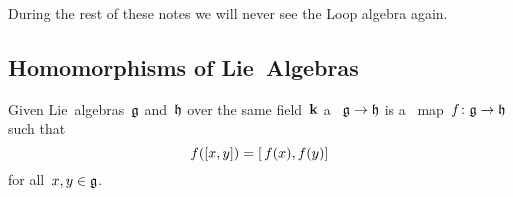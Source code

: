 \begin{remark}
  During the rest of these notes we will never see the Loop algebra again.
\end{remark}





\subsection{Homomorphisms of Lie~Algebras}


\begin{definition}
 Given Lie~algebras~$\mathfrak{g}$ and~$\mathfrak{h}$ over the same field~$\kf$ a ~$\mathfrak{g} \to \mathfrak{h}$ is a~{\linear{$\kf$}} map~$f \colon \mathfrak{g} \to \mathfrak{h}$ such that
 \[
  f([x,y])
  =
  [\, f(x),f(y)]
 \]
 for all~$x, y \in \mathfrak{g}$.
\end{definition}


